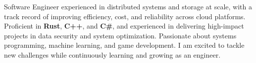 
\begin{cvparagraph}

Software Engineer experienced in distributed systems and storage at scale, with a track record of improving efficiency, cost, and reliability across cloud platforms. Proficient in \textbf{Rust}, \textbf{C++}, and \textbf{C\#}, and experienced in delivering high-impact projects in data security and system optimization. Passionate about systems programming, machine learning, and game development. I am excited to tackle new challenges while continuously learning and growing as an engineer.

\end{cvparagraph}
